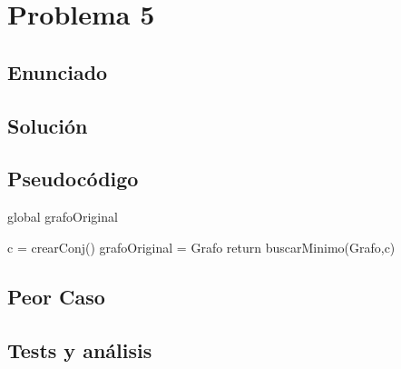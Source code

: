 \section{Problema 5}

\subsection{Enunciado}

\subsection{Soluci\'on}

\subsection{Pseudocódigo}

global grafoOriginal

\begin{codebox}
\li	c = crearConj()
\li	grafoOriginal = Grafo
\li	return buscarMinimo(Grafo,c)
\end{codebox}


\subsection{Peor Caso}


\subsection{Tests y análisis}


